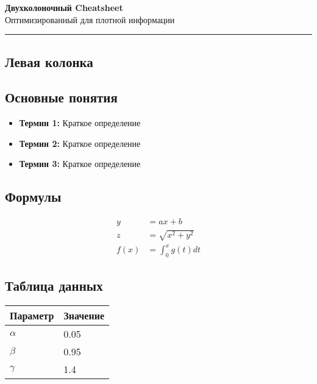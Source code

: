\documentclass[10pt,landscape,a4paper]{article}
\begin{document}
\begin{center}
    {\Huge\bfseries Двухколоночный Cheatsheet}\\[0.5cm]
    {\large Оптимизированный для плотной информации}\\[0.3cm]
    \vspace{0.3cm}
    \rule{\textwidth}{1pt}
\end{center}

\providecommand{\contributors}{}

\begin{multicols}{2}

\section{Левая колонка}

\subsection{Основные понятия}
\begin{itemize}
    \item \textbf{Термин 1:} Краткое определение
    \item \textbf{Термин 2:} Краткое определение
    \item \textbf{Термин 3:} Краткое определение
\end{itemize}

\subsection{Формулы}
\begin{align}
    y &= ax + b \\
    z &= \sqrt{x^2 + y^2} \\
    f(x) &= \int_0^x g(t) dt
\end{align}

\subsection{Таблица данных}
\begin{center}
\small
\begin{tabular}{@{}ll@{}}
\toprule
Параметр & Значение \\
\midrule
$\alpha$ & 0.05 \\
$\beta$ & 0.95 \\
$\gamma$ & 1.4 \\
\bottomrule
\end{tabular}
\end{center}


\end{multicols}
\end{document}
